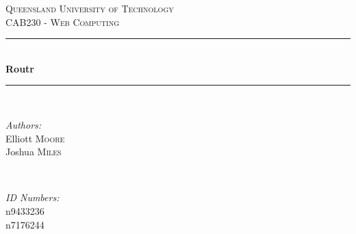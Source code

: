 
\begin{titlepage}

\newcommand{\HRule}{\rule{\linewidth}{0.5mm}} %

\centering %
 

\textsc{\LARGE Queensland University of Technology}\\[1cm] %
\textsc{\Large CAB230 - Web Computing}\\[0.5cm] %


\HRule \\[0.4cm]
{ \huge \bfseries Routr}\\[0.2cm] %
\HRule \\[.5cm]
 

\begin{minipage}{0.45\textwidth}
\begin{flushleft} \large
\emph{Authors:}\\
Elliott \textsc{Moore}\\
Joshua \textsc{Miles}\\
\end{flushleft}
\end{minipage}
~
\begin{minipage}{0.45\textwidth}
\begin{flushright} \large
\emph{ID Numbers:}\\
n9433236\\
n7176244
\end{flushright}
\end{minipage}\\[1.5cm]


\end{titlepage}
